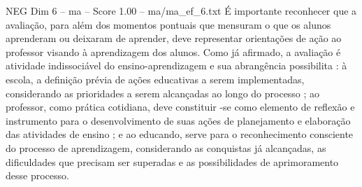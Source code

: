 \begin{textsample}{NEG Dim 6 – ma – Score 1.00 – ma/ma\_ef\_6.txt}
É importante reconhecer que a avaliação, para além dos momentos pontuais que mensuram o que os alunos aprenderam ou deixaram de aprender, deve representar orientações de ação ao professor visando à aprendizagem dos alunos.
Como já afirmado, a avaliação é atividade indissociável do ensino-aprendizagem e sua abrangência possibilita : à escola, a definição prévia de ações educativas a serem implementadas, considerando as prioridades a serem alcançadas ao longo do processo ; ao professor, como prática cotidiana, deve constituir -se como elemento de reflexão e instrumento para o desenvolvimento de suas ações de planejamento e elaboração das atividades de ensino ; e ao educando, serve para o reconhecimento consciente do processo de aprendizagem, considerando as conquistas já alcançadas, as dificuldades que precisam ser superadas e as possibilidades de aprimoramento desse processo.

\end{textsample}
